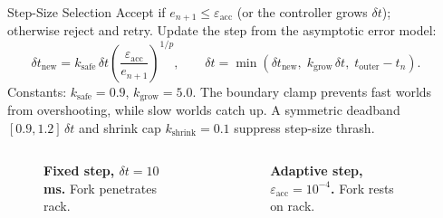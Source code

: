 \documentclass[final]{beamer}
\newlength{\sepwid}
\newlength{\onecolwid}
\newlength{\twocolwid}
\begin{document}
\begin{frame}[t]
\begin{columns}[t]
\begin{column}{\twocolwid}
\begin{columns}[t,totalwidth=\twocolwid]
\begin{column}{\onecolwid}
\end{column}
\end{columns}


\begin{alertblock}{Step-Size Selection}
Accept if $e_{n+1} \le \varepsilon_{\mathrm{acc}}$ (or the controller
grows $\delta t$); otherwise reject and retry. Update the step from the
asymptotic error model:
\[
\delta t_{\mathrm{new}} = k_{\mathrm{safe}}\,\delta t \left(\frac{\varepsilon_{\mathrm{acc}}}{e_{n+1}}\right)^{\!1/p},
\qquad
\delta t = \min\!\left(\delta t_{\mathrm{new}},\;
k_{\mathrm{grow}}\,\delta t,\; t_{\mathrm{outer}} - t_n\right).
\]
Constants: $k_{\mathrm{safe}} = 0.9$, $k_{\mathrm{grow}} = 5.0$. The
boundary clamp prevents fast worlds from overshooting, while slow worlds
catch up. A symmetric deadband $[0.9, 1.2]\,\delta t$ and shrink cap
$k_{\mathrm{shrink}} = 0.1$ suppress step-size thrash.
\end{alertblock}

\begin{columns}[t,totalwidth=\twocolwid]

\begin{column}{\onecolwid}

\begin{figure}
\centering
{}
\caption{\textbf{Fixed step, $\delta t = 10$ ms.} Fork penetrates rack.}
\end{figure}

\end{column}

\begin{column}{\onecolwid}

\begin{figure}
\centering
{}
\caption{\textbf{Adaptive step, $\varepsilon_{\mathrm{acc}} = 10^{-4}$.}
Fork rests on rack.}
\end{figure}

\end{column}
\end{columns}

\end{column}

\begin{column}{\sepwid}\end{column}


\end{columns}
\end{frame}
\end{document}
